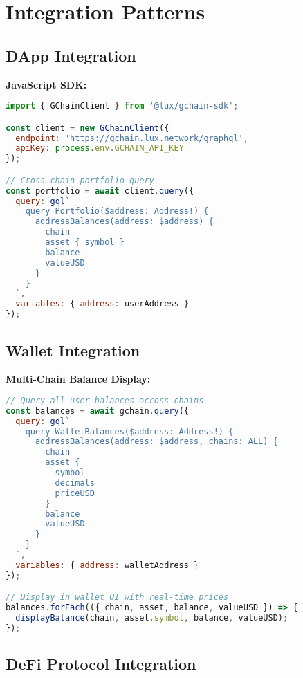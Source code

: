 \documentclass[11pt,a4paper]{article}
\begin{document}
\section{Integration Patterns}

\subsection{DApp Integration}

\textbf{JavaScript SDK:}
\begin{lstlisting}[language=JavaScript, basicstyle=\small\ttfamily]
import { GChainClient } from '@lux/gchain-sdk';

const client = new GChainClient({
  endpoint: 'https://gchain.lux.network/graphql',
  apiKey: process.env.GCHAIN_API_KEY
});

// Cross-chain portfolio query
const portfolio = await client.query({
  query: gql`
    query Portfolio($address: Address!) {
      addressBalances(address: $address) {
        chain
        asset { symbol }
        balance
        valueUSD
      }
    }
  `,
  variables: { address: userAddress }
});
\end{lstlisting}

\subsection{Wallet Integration}

\textbf{Multi-Chain Balance Display:}
\begin{lstlisting}[language=JavaScript, basicstyle=\small\ttfamily]
// Query all user balances across chains
const balances = await gchain.query({
  query: gql`
    query WalletBalances($address: Address!) {
      addressBalances(address: $address, chains: ALL) {
        chain
        asset {
          symbol
          decimals
          priceUSD
        }
        balance
        valueUSD
      }
    }
  `,
  variables: { address: walletAddress }
});

// Display in wallet UI with real-time prices
balances.forEach(({ chain, asset, balance, valueUSD }) => {
  displayBalance(chain, asset.symbol, balance, valueUSD);
});
\end{lstlisting}

\subsection{DeFi Protocol Integration}
\end{document}
